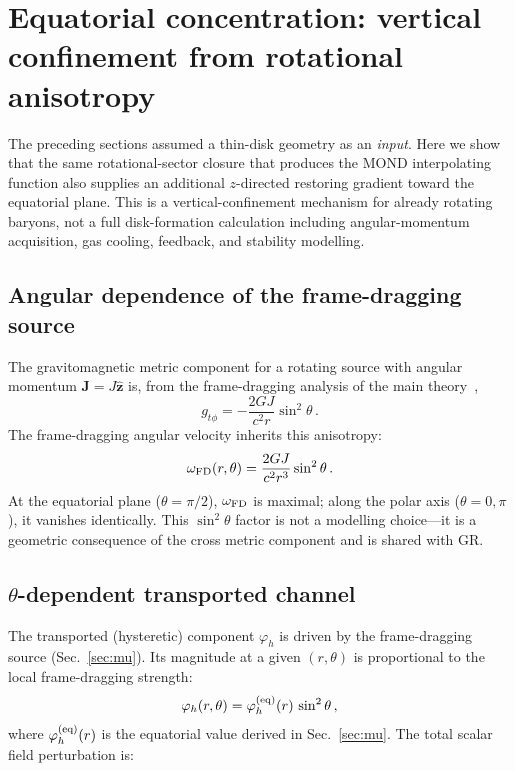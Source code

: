 \documentclass[11pt]{article}
\begin{document}
\section{Equatorial concentration: vertical confinement from rotational anisotropy}\label{sec:disk}

The preceding sections assumed a thin-disk geometry as an \emph{input}.
Here we show that the same rotational-sector closure that produces the
MOND interpolating function also supplies an additional
$z$-directed restoring gradient toward the equatorial plane.  This is a
vertical-confinement mechanism for already rotating baryons, not a full
disk-formation calculation including angular-momentum acquisition, gas
cooling, feedback, and stability modelling.

\subsection{Angular dependence of the frame-dragging source}

The gravitomagnetic metric component for a rotating source with angular momentum $\mathbf{J}=J\hat{\mathbf{z}}$ is, from the frame-dragging analysis of the main theory~\cite{Lotishvili2026},
\begin{equation}
g_{t\phi} = -\frac{2GJ}{c^2 r}\sin^2\theta\,.
\label{eq:gtphi_theta}
\end{equation}
The frame-dragging angular velocity inherits this anisotropy:
\begin{equation}
\omega_{\rm FD}(r,\theta) = \frac{2GJ}{c^2 r^3}\sin^2\theta\,.
\label{eq:omegaFD_theta}
\end{equation}
At the equatorial plane ($\theta=\pi/2$), $\omega_{\rm FD}$ is maximal; along the polar axis ($\theta=0,\pi$), it vanishes identically. This $\sin^2\theta$ factor is not a modelling choice---it is a geometric consequence of the cross metric component and is shared with GR.

\subsection[theta-dependent transported channel]{$\theta$-dependent transported channel}

The transported (hysteretic) component $\varphi_h$ is driven by the frame-dragging source (Sec.~\ref{sec:mu}). Its magnitude at a given $(r,\theta)$ is proportional to the local frame-dragging strength:
\begin{equation}
\varphi_h(r,\theta) = \varphi_h^{(\rm eq)}(r)\,\sin^2\theta\,,
\label{eq:phih_theta}
\end{equation}
where $\varphi_h^{(\rm eq)}(r)$ is the equatorial value derived in Sec.~\ref{sec:mu}. The total scalar field perturbation is:
\end{document}
